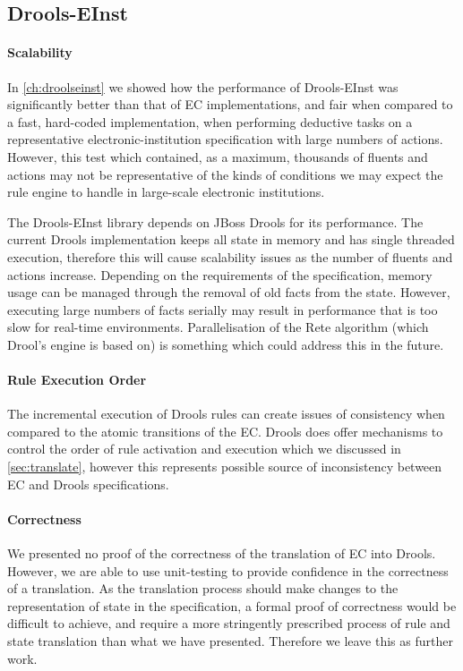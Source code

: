 \subsection{Drools-EInst}

\paragraph{Scalability}

In \autoref{ch:droolseinst} we showed how the performance of Drools-EInst was
significantly better than that of \ac{EC} implementations, and fair when
compared to a fast, hard-coded implementation, when performing deductive tasks
on a representative electronic-institution specification with large numbers of
actions. However, this test which contained, as a maximum, thousands of
fluents and actions may not be representative of the kinds of conditions we
may expect the rule engine to handle in large-scale electronic institutions.

The Drools-EInst library depends on JBoss Drools for its performance. The
current Drools implementation keeps all state in memory and has single
threaded execution, therefore this will cause scalability issues as the number
of fluents and actions increase. Depending on the requirements of the
specification, memory usage can be managed through the removal of old facts
from the state. However, executing large numbers of facts serially may result
in performance that is too slow for real-time environments. Parallelisation of
the Rete algorithm (which Drool's engine is based on) is something which could
address this in the future.

\paragraph{Rule Execution Order}

The incremental execution of Drools rules can create issues of consistency
when compared to the atomic transitions of the \ac{EC}. Drools does offer
mechanisms to control the order of rule activation and execution which we
discussed in \autoref{sec:translate}, however this represents possible source of inconsistency between \ac{EC} and Drools specifications.

\paragraph{Correctness} We presented no proof of the correctness of the
translation of \ac{EC} into Drools. However, we are able to use unit-testing
to provide confidence in the correctness of a translation. As the translation
process should make changes to the representation of state in the
specification, a formal proof of correctness would be difficult to achieve,
and require a more stringently prescribed process of rule and state
translation than what we have presented. Therefore we leave this as further
work.

